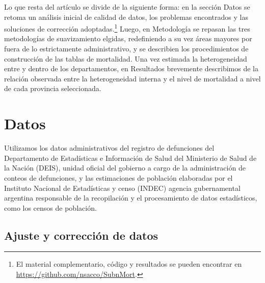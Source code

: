 \documentclass[12pt,]{article}
\begin{document}
Lo que resta del artículo se divide de la siguiente forma: en la sección
Datos se retoma un análisis inicial de calidad de datos, los problemas
encontrados y las soluciones de corrección adoptadas.\footnote{El
  material complementario, código y resultados se pueden encontrar en
  \url{https://github.com/nsacco/SubnMort}.} Luego, en Metodología se
repasan las tres metodologías de suavizamiento elgidas, redefiniendo a
su vez áreas mayores por fuera de lo estrictamente administrativo, y se
describien los procedimientos de construcción de las tablas de
mortalidad. Una vez estimada la heterogeneidad entre y dentro de los
departamentos, en Resultados brevemente describimos de la relación
observada entre la heterogeneidad interna y el nivel de mortalidad a
nivel de cada provincia seleccionada.

\hypertarget{datos}{%
\section{Datos}\label{datos}}

Utilizamos los datos administrativos del registro de defunciones del
Departamento de Estadísticas e Información de Salud del Ministerio de
Salud de la Nación (DEIS), unidad oficial del gobierno a cargo de la
administración de conteos de defunciones, y las estimaciones de
población elaboradas por el Instituto Nacional de Estadísticas y censo
(INDEC) agencia gubernamental argentina responsable de la recopilación y
el procesamiento de datos estadísticos, como los censos de población.

\hypertarget{ajuste-y-correcciuxf3n-de-datos}{%
\subsection{Ajuste y corrección de
datos}\label{ajuste-y-correcciuxf3n-de-datos}}
\end{document}

